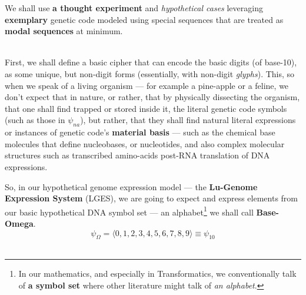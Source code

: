 \documentclass[a4paper, 18pt]{book} %
\begin{document}
We shall use \textbf{a thought experiment} and \textit{hypothetical cases} leveraging \textbf{exemplary} genetic code modeled using special sequences that are treated as \textbf{modal sequences} at minimum.


\vspace{2em}
\\



\vspace{2em}
First, we shall define a basic cipher that can encode the basic digits (of base-10), as some unique, but non-digit forms (essentially, with non-digit \textit{glyphs}). This, so when we speak of a living organism --- for example a pine-apple or a feline, we don't expect that in nature, or rather, that by physically dissecting the organism, that one shall find trapped or stored inside it, the literal genetic code symbols (such as those in $\psi_{na}$), but rather, that they shall find natural literal expressions or instances of genetic code's \textbf{material basis} --- such as the chemical base molecules that define nucleobases, or nucleotides, and also complex molecular structures such as transcribed amino-acids post-RNA translation of DNA expressions.

So, in our hypothetical genome expression model --- the \textbf{Lu-Genome Expression System} (LGES), we are going to expect and express elements from our basic hypothetical DNA symbol set --- an alphabet\footnote{In our mathematics, and especially in Transformatics, we conventionally talk of \textbf{a symbol set} where other literature might talk of \textit{an alphabet}.} we shall call \textbf{Base-Omega}.\\

\begin{equation}
\label{EQHYPDNASS}
\psi_{\Omega} = \langle 0, 1, 2, 3, 4, 5, 6, 7, 8, 9 \rangle \equiv \psi_{10}
\end{equation}\\
\end{document}
